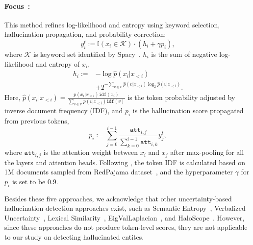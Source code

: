 \paragraph{Focus~\citep{zhang-etal-2023-enhancing-uncertainty}:}
   This method refines log-likelihood and entropy using keyword selection, hallucination propagation, and probability correction:
    $$y^t_i:=\mathbb{I}(x_i\in\mathcal{K})\cdot(h_i+\gamma p_i),$$
    where $\mathcal{K}$ is keyword set identified by Spacy~\citep{spacy2}. $h_i$ is the sum of negative log-likelihood and entropy of $x_i$,
    \begin{align*}
        h_i:=&-\log\hat{p}(x_i|x_{<i})\\
        &+2^{-\sum_{v\in \mathcal{V}}\hat{p}(v|x_{<i})\log_2\hat{p}(v|x_{<i})}.
    \end{align*}
    Here, $\hat{p}(x_i|x_{<i})=\frac{p(x_i|x_{<i})\texttt{idf}(x_i)}{\sum_{v\in\mathcal{V}}p(v|x_{<i})\texttt{idf}(v)}$ is the token probability adjusted by inverse document frequency (IDF), 
    and $p_i$ is the hallucination score propagated from previous tokens,
    $$p_i:=\sum_{j=0}^{i-1}\frac{\texttt{att}_{i,j}}{\sum_{k=0}^{i-1}\texttt{att}_{i,k}}y^t_j,$$ where $\texttt{att}_{i,j}$ is the attention weight between $x_i$ and $x_j$ after max-pooling for all the layers and attention heads. Following \citet{zhang-etal-2023-enhancing-uncertainty}, the token IDF is calculated based on 1M documents sampled from RedPajama dataset~\citep{weber2024redpajama}, and the hyperparameter $\gamma$ for $p_i$ is set to be 0.9. 

Besides these five approaches, we acknowledge that other uncertainty-based hallucination detection approaches exist, such as Semantic Entropy~\citep{kuhn2023semantic}, Verbalized Uncertainty~\citep{kadavath2022languagemodelsmostlyknow}, Lexical Similarity~\citep{fomicheva-etal-2020-unsupervised}, EigValLaplacian~\citep{lin2024generating}, and HaloScope~\citep{du2024haloscope}. However, since these approaches do not produce token-level scores, they are not applicable to our study on detecting hallucinated entites.